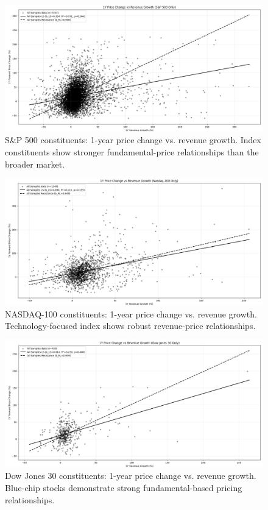 \documentclass[11pt]{article}
\begin{document}
\begin{figure}[!htbp]
\centering
\includegraphics[width=\textwidth]{images/1_year_sp500_plot.png}
\caption{S\&P 500 constituents: 1-year price change vs. revenue growth. Index constituents show stronger fundamental-price relationships than the broader market.}
\label{fig:sp500}
\end{figure}

\begin{figure}[!htbp]
\centering
\includegraphics[width=\textwidth]{images/1_year_nasdaq100_plot.png}
\caption{NASDAQ-100 constituents: 1-year price change vs. revenue growth. Technology-focused index shows robust revenue-price relationships.}
\label{fig:nasdaq100}
\end{figure}

\begin{figure}[!htbp]
\centering
\includegraphics[width=\textwidth]{images/1_year_dow30_plot.png}
\caption{Dow Jones 30 constituents: 1-year price change vs. revenue growth. Blue-chip stocks demonstrate strong fundamental-based pricing relationships.}
\label{fig:dow30}
\end{figure}
\end{document}
